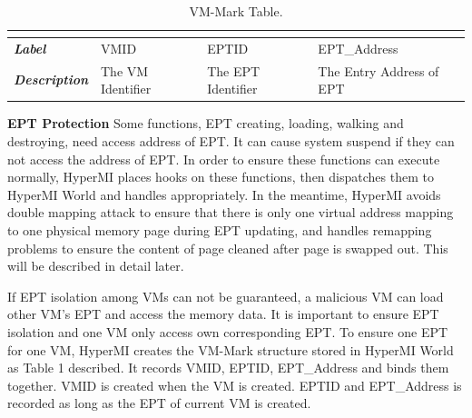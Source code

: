 \documentclass[conference]{IEEEtran}
\begin{document}
\begin{table}[htbp]
\centering
\caption{VM-Mark Table.}\label{tab1}
\begin{tabular}{p{1.4cm}|p{1.2cm}|p{1.1cm}|p{1.7cm}}
\hline
\multicolumn{4}{c}{\bfseries\textbf\centering{VM-Mark Table}}\\
\hline
{\itshape\bfseries Label} & VMID & EPTID & EPT\_Address\\
\hline
{\itshape\bfseries Description} & { The VM Identifier} & The EPT Identifier & The Entry Address of EPT\\
\hline
\end{tabular}
\end{table}


\textbf{EPT Protection}
Some functions, EPT creating, loading, walking and destroying, need access address of EPT. It can cause system suspend if they can not access the address of EPT. In order to ensure these functions can execute normally, HyperMI places hooks on these functions, then dispatches them to HyperMI World and handles appropriately. In the meantime, HyperMI avoids double mapping attack to ensure that there is only one virtual address mapping to one physical memory page during EPT updating, and handles remapping problems to ensure the content of page cleaned after page is swapped out. This will be described in detail later.

If EPT isolation among VMs can not be guaranteed, a malicious VM can load other VM's EPT and access the memory data. It is important to ensure EPT isolation and one VM only access own corresponding EPT.
To ensure one EPT for one VM, HyperMI creates the VM-Mark structure stored in HyperMI World as Table 1 described. It records VMID, EPTID, EPT\_Address and binds them together. VMID is created when the VM is created. 
 EPTID and EPT\_Address is recorded as long as the EPT of current VM is created.
\end{document}
